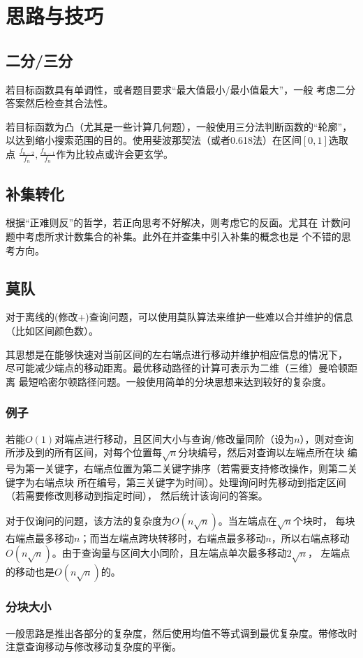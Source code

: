 \section{思路与技巧}
\subsection{二分/三分}
若目标函数具有单调性，或者题目要求``最大值最小/最小值最大''，一般
考虑二分答案然后检查其合法性。

若目标函数为凸（尤其是一些计算几何题），一般使用三分法判断函数的``轮廓''，
以达到缩小搜索范围的目的。使用斐波那契法（或者0.618法）在区间$[0,1]$选取点
$\frac{f_{n-2}}{f_n},\frac{f_{n-1}}{f_n}$作为比较点或许会更玄学。
\subsection{补集转化}
根据``正难则反''的哲学，若正向思考不好解决，则考虑它的反面。尤其在
计数问题中考虑所求计数集合的补集。此外在并查集中引入补集的概念也是
个不错的思考方向。
\subsection{莫队}
对于离线的(修改+)查询问题，可以使用莫队算法来维护一些难以合并维护的信息
（比如区间颜色数）。

其思想是在能够快速对当前区间的左右端点进行移动并维护相应信息的情况下，
尽可能减少端点的移动距离。最优移动路径的计算可表示为二维（三维）曼哈顿距离
最短哈密尔顿路径问题。一般使用简单的分块思想来达到较好的复杂度。

\subsubsection{例子}
若能$O(1)$对端点进行移动，且区间大小与查询/修改量同阶（设为$n$），则对查询
所涉及到的所有区间，对每个位置每$\sqrt{n}$分块编号，然后对查询以左端点所在块
编号为第一关键字，右端点位置为第二关键字排序（若需要支持修改操作，则第二关键字为右端点块
所在编号，第三关键字为时间）。处理询问时先移动到指定区间（若需要修改则移动到指定时间），
然后统计该询问的答案。

对于仅询问的问题，该方法的复杂度为$O(n\sqrt{n})$。当左端点在$\sqrt{n}$个块时，
每块右端点最多移动$n$；而当左端点跨块转移时，右端点最多移动$n$，所以右端点移动
$O(n\sqrt{n})$。由于查询量与区间大小同阶，且左端点单次最多移动$2\sqrt{n}$，
左端点的移动也是$O(n\sqrt{n})$的。
\subsubsection{分块大小}
一般思路是推出各部分的复杂度，然后使用均值不等式调到最优复杂度。带修改时
注意查询移动与修改移动复杂度的平衡。
